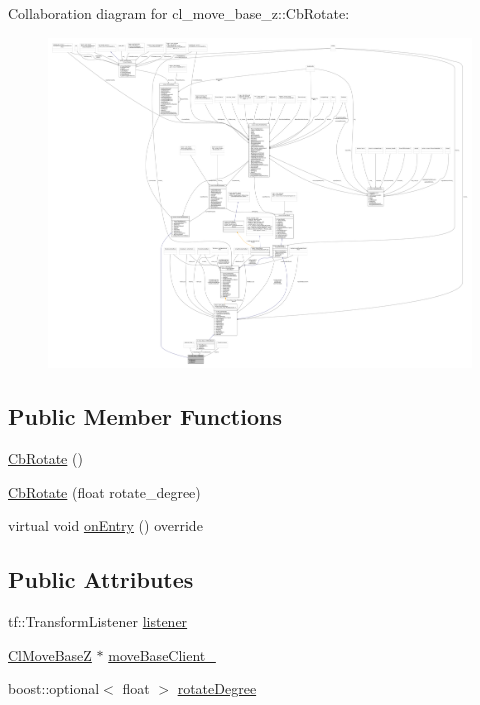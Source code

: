 Collaboration diagram for cl\+\_\+move\+\_\+base\+\_\+z\+:\+:Cb\+Rotate\+:
\nopagebreak
\begin{figure}[H]
\begin{center}
\leavevmode
\includegraphics[width=350pt]{classcl__move__base__z_1_1CbRotate__coll__graph}
\end{center}
\end{figure}
\subsection*{Public Member Functions}
\begin{DoxyCompactItemize}
\item 
\hyperlink{classcl__move__base__z_1_1CbRotate_a00dc68fbc8e72461f338de1cbdfceffd}{Cb\+Rotate} ()
\item 
\hyperlink{classcl__move__base__z_1_1CbRotate_ac5b1f8c358d719d2cdc8417f65143ad8}{Cb\+Rotate} (float rotate\+\_\+degree)
\item 
virtual void \hyperlink{classcl__move__base__z_1_1CbRotate_a316ee51ecfd3f10fd1edae0d7d3b26c0}{on\+Entry} () override
\end{DoxyCompactItemize}
\subsection*{Public Attributes}
\begin{DoxyCompactItemize}
\item 
tf\+::\+Transform\+Listener \hyperlink{classcl__move__base__z_1_1CbRotate_a2b57c5f392fde0a3bf38f5fd6e1bde11}{listener}
\item 
\hyperlink{classcl__move__base__z_1_1ClMoveBaseZ}{Cl\+Move\+BaseZ} $\ast$ \hyperlink{classcl__move__base__z_1_1CbRotate_a390623f5bcbdad18fe2a65428e4621cb}{move\+Base\+Client\+\_\+}
\item 
boost\+::optional$<$ float $>$ \hyperlink{classcl__move__base__z_1_1CbRotate_a83e9f97e917044f919c98a55d8e00db6}{rotate\+Degree}
\end{DoxyCompactItemize}


